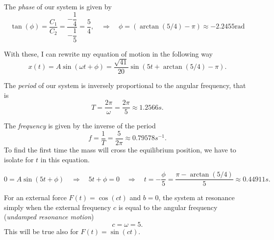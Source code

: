 \documentclass[11pt]{article}
\begin{document}
\begin{solution}
The \textit{phase} of our system is given by
\begin{equation*}
\tan(\phi) =  \dfrac{C_{1}}{C_{2}} = \dfrac{-\dfrac{1}{4}}{-\dfrac{1}{5}} = \dfrac{5}{4}, \quad \Rightarrow \quad \boxed{\phi = (\arctan(5/4) - \pi) } \approx -2.2455 \text{rad}
\end{equation*}

With these, I can rewrite my equation of motion in the following way
\begin{equation*}
\boxed{x(t) =  A \sin ( \omega t + \phi) = \frac{\sqrt{41}}{20}\sin(5t + \arctan(5/4)-\pi)}.
\end{equation*}

The \textit{period} of our system is inversely proportional to the angular frequency, that is
\begin{equation*}
\boxed{T =  \dfrac{2\pi}{\omega} = \dfrac{2\pi}{5} \approx 1.2566s}.
\end{equation*}

The \textit{frequency} is given by the inverse of the period
\begin{equation*}
\boxed{f =  \dfrac{1}{T} = \dfrac{5}{2\pi} \approx 0.79578s^{-1}}.
\end{equation*}
To find the first time the mass will cross the equilibrium position,  we have to isolate for $t$ in this equation.

\begin{equation*}
0 =  A \sin ( 5t + \phi) \quad \Rightarrow \quad 5t + \phi =0 \quad \Rightarrow \quad \boxed{t  = -\dfrac{\phi}{5} = \dfrac{\pi - \arctan(5/4)}{5} \approx 0.44911s}.
\end{equation*}

For an external force $F(t)=\cos(ct)$ and $b=0$, the system at resonance simply when the external frequency $c$ is equal to the angular frequency (\textit{undamped resonance motion})
\[\boxed{c = \omega = 5}.\]
This will be true also for $F(t)=\sin(ct)$.
\end{solution}
\end{document}
